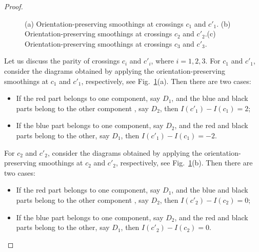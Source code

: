 \documentclass[12pt]{amsart}
\theoremstyle{noparens}
\numberwithin{equation}{section}
\numberwithin{equation}{section}
\begin{document}
\begin{proof}
\begin{figure}[!ht]
		\caption{(a) Orientation-preserving smoothings at crossings $c_1$ and $c'_1$. (b) Orientation-preserving smoothings at crossings $c_2$ and $c'_2$.(c) Orientation-preserving smoothings at crossings $c_3$ and $c'_3$.} \label{fig2244}
	\end{figure}
	
	Let us discuss the parity of crossings $c_i$ and $c'_i$, where $i=1, 2, 3$. For $c_1$ and $c'_1$, consider the diagrams obtained by applying the orientation-preserving smoothings at $c_1$ and $c'_1$, respectively, see Fig.~\ref{fig2244}(a). Then there are two cases:
	\begin{itemize}
		\item[{(1)}] If the red part belongs to one component, say $D_1$, and the blue and black parts belong to the other component , say $D_2$, then $I(c'_1) - I(c_1) = 2$;
		\item[{(2)}] If the blue part belongs to one component, say $D_2$, and the red and black parts belong to the other, say $D_1$, then $I(c'_1) - I(c_1) = -2$.
	\end{itemize}
	
	For $c_2$ and $c'_2$, consider the diagrams obtained by applying the orientation-preserving smoothings at $c_2$ and $c'_2$, respectively, see Fig.~\ref{fig2244}(b). Then there are two cases:
	\begin{itemize}
		\item[{(1)}] If the red part belongs to one component, say $D_1$, and the blue and black parts belong to the other component , say $D_2$, then $I(c'_2) - I(c_2) = 0$;
		\item[{(2)}] If the blue part belongs to one component, say $D_2$, and the red and black parts belong to the other, say $D_1$, then $I(c'_2) - I(c_2) = 0$.
	\end{itemize}
	

\end{proof}
\end{document}
